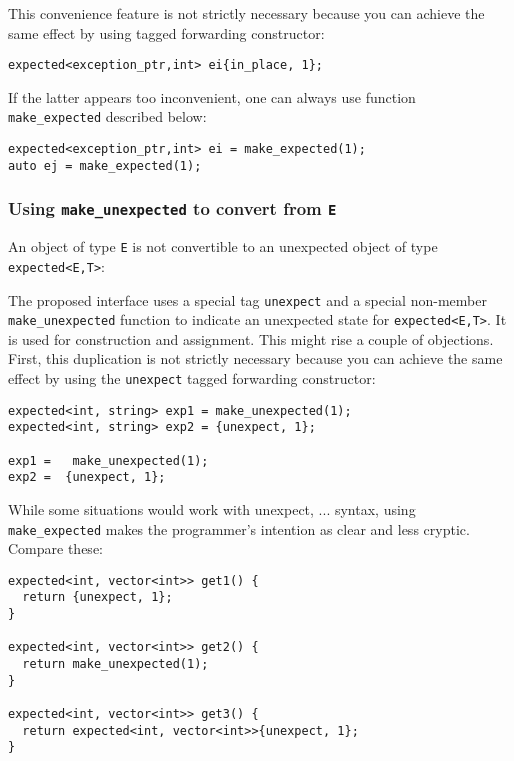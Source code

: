 \documentclass[a4paper,10pt]{article}
\newcommand{\cpp}[1]{\lstinline{#1}}
\begin{document}
This convenience feature is not strictly necessary because you can achieve the same effect by using tagged forwarding constructor:

\begin{lstlisting}
expected<exception_ptr,int> ei{in_place, 1};
\end{lstlisting}

If the latter appears too inconvenient, one can always use function \cpp{make_expected} described below:

\begin{lstlisting}
expected<exception_ptr,int> ei = make_expected(1); 
auto ej = make_expected(1); 
\end{lstlisting}

\subsubsection{Using \cpp{make_unexpected} to convert from \cpp{E}}

An object of type \cpp{E} is not convertible to an unexpected object of type \cpp{expected<E,T>}:

The proposed interface uses a special tag \cpp{unexpect} and a special non-member \cpp{make_unexpected} function to indicate an unexpected state for \cpp{expected<E,T>}. It is used for construction and assignment. This might rise a couple of objections. First, this duplication is not strictly necessary because you can achieve the same effect by using the \cpp{unexpect} tagged forwarding constructor:

\begin{lstlisting}
expected<int, string> exp1 = make_unexpected(1); 
expected<int, string> exp2 = {unexpect, 1}; 

exp1 =   make_unexpected(1);
exp2 =  {unexpect, 1};

\end{lstlisting}

While some situations would work with {unexpect, ...} syntax, using \cpp{make_expected} makes the programmer's intention as clear and less cryptic. Compare these:

\begin{lstlisting}
expected<int, vector<int>> get1() {
  return {unexpect, 1};
}

expected<int, vector<int>> get2() {
  return make_unexpected(1);
}

expected<int, vector<int>> get3() {
  return expected<int, vector<int>>{unexpect, 1};
}
\end{lstlisting}
\end{document}
